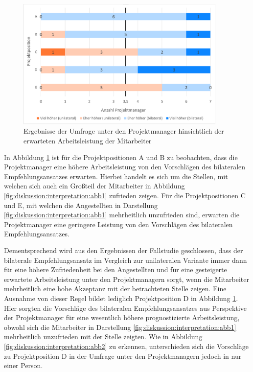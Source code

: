 \begin{figure}[h]
	\centering
	\includegraphics[width=0.925\textwidth]{gfx/ergebnisse-projektmanager-arbeitsleistung.png}	
	\caption{Ergebnisse der Umfrage unter den Projektmanager hinsichtlich der erwarteten Arbeitsleistung der Mitarbeiter}
	\label{fig:diskussion:interpretation:abb4}
\end{figure}

In Abbildung \ref{fig:diskussion:interpretation:abb4} ist für die Projektpositionen A und B zu beobachten, dass die Projektmanager eine höhere Arbeitsleistung von den Vorschlägen des bilateralen Empfehlungsansatzes erwarten. Hierbei handelt es sich um die Stellen, mit welchen sich auch ein Großteil der Mitarbeiter in Abbildung \ref{fig:diskussion:interpretation:abb1} zufrieden zeigen. Für die Projektpositionen C und E, mit welchen die Angestellten in Darstellung \ref{fig:diskussion:interpretation:abb1} mehrheitlich unzufrieden sind, erwarten die Projektmanager eine geringere Leistung von den Vorschlägen des bilateralen Empfehlungsansatzes.

Dementsprechend wird aus den Ergebnissen der Fallstudie geschlossen, dass der bilaterale Empfehlungsansatz im Vergleich zur unilateralen Variante immer dann für eine höhere Zufriedenheit bei den Angestellten und für eine gesteigerte erwartete Arbeitsleistung unter den Projektmanagern sorgt, wenn die Mitarbeiter mehrheitlich eine hohe Akzeptanz mit der betrachteten Stelle zeigen. Eine Ausnahme von dieser Regel bildet lediglich Projektposition D in Abbildung \ref{fig:diskussion:interpretation:abb4}. Hier sorgten die Vorschläge des bilateralen Empfehlungsansatzes aus Perspektive der Projektmanager für eine wesentlich höhere prognostizierte Arbeitsleistung, obwohl sich die Mitarbeiter in Darstellung \ref{fig:diskussion:interpretation:abb1} mehrheitlich unzufrieden mit der Stelle zeigten. Wie in Abbildung \ref{fig:diskussion:interpretation:abb2} zu erkennen, unterschieden sich die Vorschläge zu Projektposition D in der Umfrage unter den Projektmanagern jedoch in nur einer Person.

